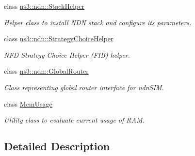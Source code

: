 \begin{DoxyCompactItemize}
class \hyperlink{classns3_1_1ndn_1_1StackHelper}{ns3\+::ndn\+::\+Stack\+Helper}
\begin{DoxyCompactList}\small\item\em Helper class to install N\+DN stack and configure its parameters. \end{DoxyCompactList}\item 
class \hyperlink{classns3_1_1ndn_1_1StrategyChoiceHelper}{ns3\+::ndn\+::\+Strategy\+Choice\+Helper}
\begin{DoxyCompactList}\small\item\em N\+FD Strategy Choice Helper (F\+IB) helper. \end{DoxyCompactList}\item 
class \hyperlink{classns3_1_1ndn_1_1GlobalRouter}{ns3\+::ndn\+::\+Global\+Router}
\begin{DoxyCompactList}\small\item\em Class representing global router interface for ndn\+S\+IM. \end{DoxyCompactList}\item 
class \hyperlink{classMemUsage}{Mem\+Usage}
\begin{DoxyCompactList}\small\item\em Utility class to evaluate current usage of R\+AM. \end{DoxyCompactList}\end{DoxyCompactItemize}


\subsection{Detailed Description}
